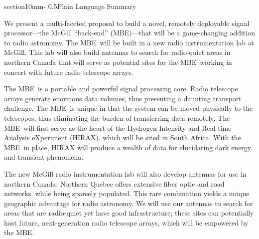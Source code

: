 \documentclass[letterpaper,11pt,preprint]{aastex}
\makeatletter
\newcommand{\mbe}{{\rm MBE}}
\renewcommand{\section}{\@startsection%
{section}{1}{0mm}{-\baselineskip}%
{0.5\baselineskip}{\normalfont\Large\bfseries}}%
\makeatother
\begin{document}
\pagestyle{plain}


\section{Plain Language Summary}

We present a multi-faceted proposal to build a novel, remotely
deployable signal processor---the McGill ``back-end'' (\mbe)---that
will be a game-changing addition to radio astronomy. The \mbe\ will be
built in a new radio instrumentation lab at McGill. This lab will also
build antennas to search for radio-quiet areas in northern Canada that
will serve as potential sites for the \mbe\ working in concert with
future radio telescope arrays.

The \mbe\ is a portable and powerful signal processing core. Radio
telescope arrays generate enormous data volumes, thus presenting a
daunting transport challenge. The \mbe\ is unique in that the system can
be moved physically to the telescopes, thus eliminating the burden of
transferring data remotely. The \mbe\ will first serve as the heart of
the Hydrogen Intensity and Real-time Analysis eXperiment (HIRAX),
which will be sited in South Africa. With the \mbe\ in place, HIRAX will
produce a wealth of data for elucidating dark energy and transient
phenomena.

The new McGill radio instrumentation lab will also develop antennas
for use in northern Canada. Northern Quebec offers extensive fiber
optic and road networks, while being sparsely populated.  This rare
combination yields a unique geographic advantage for radio astronomy.
We will use our antennas to search for areas that are radio-quiet yet
have good infrastructure; these sites can potentially host future,
next-generation radio telescope arrays, which will be empowered by the
\mbe.
\end{document}
